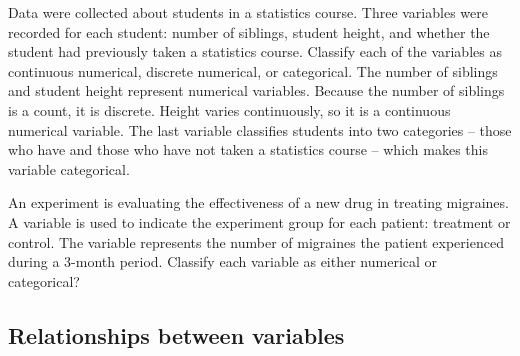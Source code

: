 \begin{examplewrap}
\begin{nexample}{Data were collected about students
    in a statistics course.
    Three variables were recorded for each student:
    number of siblings, student height, and whether
    the student had previously taken a statistics course.
    Classify each of the variables as continuous numerical,
    discrete numerical, or categorical.}
  The number of siblings and student height represent
  numerical variables.
  Because the number of siblings is a count, it is discrete.
  Height varies continuously, so it is a continuous numerical
  variable.
  The last variable classifies students into two categories
  -- those who have and those who have not taken a statistics
  course -- which makes this variable categorical.
\end{nexample}
\end{examplewrap}

\begin{exercisewrap}
\begin{nexercise}%
An experiment is evaluating the effectiveness of a new drug
in treating migraines.
A  variable is used to indicate the experiment group
for each patient: treatment or control.
The \mbox{} variable represents the number
of migraines the patient experienced during a 3-month period.
\mbox{Classify} each variable as either numerical or
categorical?\footnotemark
\end{nexercise}
\end{exercisewrap}


\D{\newpage}

\subsection{Relationships between variables}
\label{variableRelations}

